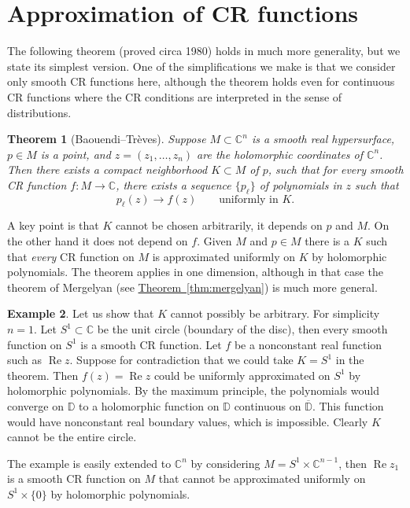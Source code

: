 \documentclass[12pt,openany]{book}
\renewcommand{\Re}{\operatorname{Re}}
\newcommand{\C}{{\mathbb{C}}}
\newcommand{\D}{{\mathbb{D}}}
\theoremstyle{plain}
\newtheorem{thm}{Theorem}[section]
\theoremstyle{remark}
\theoremstyle{definition}
\theoremstyle{exercise}
\theoremstyle{example}
\newtheorem{example}[thm]{Example}
\newcommand{\thmref}[1]{\hyperref[#1]{Theorem~\ref*{#1}}}
\begin{document}
\section{Approximation of CR functions}

The following theorem (proved circa 1980) holds in much more generality, but
we state its simplest version.  One of the simplifications we make is that
we consider only smooth CR functions here, although the theorem holds even
for continuous CR functions where the CR conditions are interpreted in the
sense of distributions.

\begin{thm}[Baouendi--Tr{\`e}ves]%
\pagebreak[2]
Suppose $M \subset \C^n$ is a smooth real hypersurface,
$p \in M$ is a point,
and
$z=(z_1,\dots,z_n)$ are the holomorphic coordinates of $\C^n$.
Then there exists a compact
neighborhood $K \subset M$ of $p$, such that for every smooth CR function $f \colon M \to \C$,
there exists a sequence $\{ p_\ell \}$ of polynomials in $z$ such that
\begin{equation*}
p_\ell(z) \to f(z)
\qquad \text{uniformly in $K$.}
\end{equation*}
\end{thm}

A key point is that $K$ cannot be chosen arbitrarily, it depends on $p$ and $M$.
On the other hand it does not depend on $f$.  Given $M$ and $p \in M$
there is a $K$ such that \emph{every} CR function on $M$ is approximated
uniformly on $K$ by holomorphic polynomials.  The theorem applies in one
dimension, although in that case the theorem of Mergelyan
(see \thmref{thm:mergelyan}) is much more general.

\begin{example}
Let us show that $K$ cannot possibly be arbitrary.  For simplicity $n=1$.
Let $S^1 \subset \C$ be the unit circle (boundary of the disc),
then every smooth function on $S^1$ is a smooth CR function.  Let $f$
be a nonconstant real function such as $\Re z$.  Suppose for
contradiction that we could take $K = S^1$ in the theorem.  Then $f(z) = \Re
z$ could be uniformly
approximated on $S^1$ by holomorphic polynomials.
By the maximum principle, the
polynomials would converge on $\D$ to a holomorphic function on $\D$
continuous on $\overline{\D}$.  This function would have nonconstant real boundary values,
which is impossible.  Clearly $K$ cannot be the entire circle.

The example is easily extended to $\C^n$
by considering
$M = S^1 \times \C^{n-1}$, then $\Re z_1$ is a smooth CR function on $M$ that cannot be
approximated uniformly on $S^1 \times \{ 0 \}$ by holomorphic polynomials.
\end{example}
\end{document}
